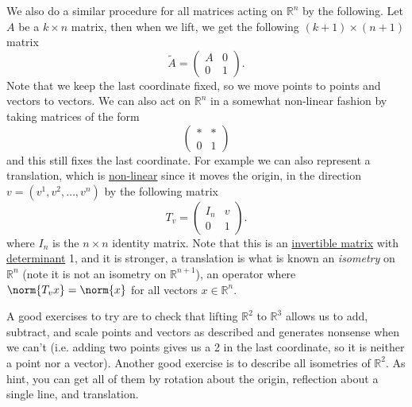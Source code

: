 We also do a similar procedure for all matrices acting on $\mathbb{R}^n$ by the following. Let $A$ be a $k \times n$ matrix, then when we lift, we get the following $(k+1) \times (n+1)$ matrix
\[
\widetilde{A} = \left( \begin{array}{c|c} A & 0 \\ \hline 0 & 1 \end{array} \right).
\]
Note that we keep the last coordinate fixed, so we move points to points and vectors to vectors. We can also act on $\mathbb{R}^n$ in a somewhat non-linear fashion by taking matrices of the form
\[
\left( \begin{array}{c|c} \ast & \ast \\ \hline 0 & 1 \end{array} \right)
\]
and this still fixes the last coordinate. For example we can also represent a translation, which is \hyperlink{non_linear_example}{non-linear} since it moves the origin, in the direction $v = (v^1, v^2, \dotsc, v^n)$ by the following matrix
\[
T_v = \left( \begin{array}{c|c} I_n & v \\ \hline 0 & 1 \end{array} \right).
\]
where $I_n$ is the $n \times n$ identity matrix. Note that this is an \hyperref[inverse_matrix]{invertible matrix} with \hyperref[elementarydeterminants]{determinant} 1, and it is stronger, a translation is what is known an \emph{isometry} on $\mathbb{R}^n$ (note it is not an isometry on $\mathbb{R}^{n+1}$), an operator where $\norm{T_v x} = \norm{x}$ for all vectors $x \in \mathbb{R}^n$.

A good exercises to try are to check that lifting $\mathbb{R}^2$ to $\mathbb{R}^3$ allows us to add, subtract, and scale points and vectors as described and generates nonsense when we can't (i.e. adding two points gives us a 2 in the last coordinate, so it is neither a point nor a vector). Another good exercise is to describe all isometries of $\mathbb{R}^2$. As hint, you can get all of them by rotation about the origin, reflection about a single line, and translation.

\newpage
